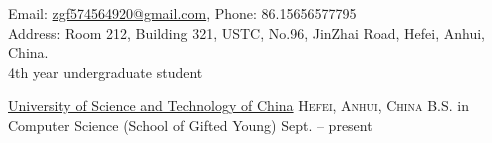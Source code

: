 \documentclass[10pt,a4paper]{article}
\begin{document}
\sloppy  %



\nobreakvspace{0.3em}  %

\noindent Email: \href{mailto:zgf574564920@gmail.com}{\mbox{zgf574564920@gmail.com}}, Phone: \textsmaller{+}86.15656577795
\\
Address: Room 212, Building 321, USTC, No.96, JinZhai Road, Hefei, Anhui, China.
\\
\noindent 4th year undergraduate student

\spacedhrule{0.2em}{-1em}  %


\headedsection  %
{\href{http://ustc.edu.cn}{University of Science and Technology of China}}
{\textsc{Hefei, Anhui, China}} {%
	\headedsubsection
	{B.S. in Computer Science (School of Gifted Young)}
	{Sept. -- present}
	{}
}


\spacedhrule{0.2em}{-1em}
\end{document}
